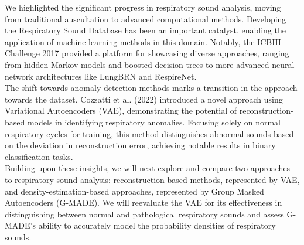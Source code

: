 We highlighted the significant progress in respiratory sound analysis, moving from traditional auscultation to advanced computational methods. Developing the Respiratory Sound Database has been an important catalyst, enabling the application of machine learning methods in this domain. Notably, the ICBHI Challenge 2017 provided a platform for showcasing diverse approaches, ranging from hidden Markov models and boosted decision trees to more advanced neural network architectures like LungBRN and RespireNet.\\
The shift towards anomaly detection methods marks a transition in the approach towards the dataset. Cozzatti et al. (2022) introduced a novel approach using Variational Autoencoders (VAE), demonstrating the potential of reconstruction-based models in identifying respiratory anomalies. Focusing solely on normal respiratory cycles for training, this method distinguishes abnormal sounds based on the deviation in reconstruction error, achieving notable results in binary classification tasks.\\
Building upon these insights, we will next explore and compare two approaches to respiratory sound analysis: reconstruction-based methods, represented by VAE, and density-estimation-based approaches, represented by Group Masked Autoencoders (G-MADE). We will reevaluate the VAE for its effectiveness in distinguishing between normal and pathological respiratory sounds and assess G-MADE's ability to accurately model the probability densities of respiratory sounds.


